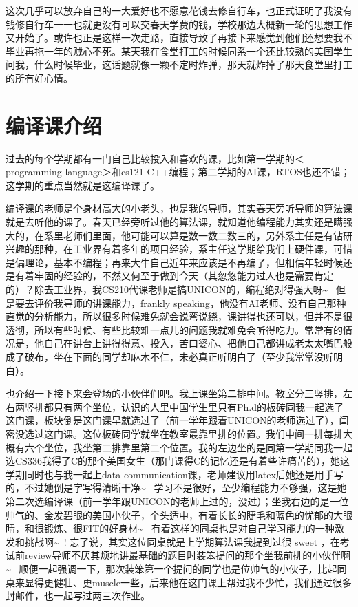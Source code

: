 \documentclass[12pt]{book}
\begin{document}
这次几乎可以放弃自己的一大爱好也不愿意花钱去修自行车，也正式证明了我没有钱修自行车一一也就更没有可以交春天学费的钱，学校那边大概新一轮的思想工作又开始了。或许也正是这样一次走路，直接导致了再接下来感觉到他们还想要我不毕业再拖一年的贼心不死。某天我在食堂打工的时候同系一个还比较熟的美国学生问我，什么时候毕业，这话题就像一颗不定时炸弹，那天就炸掉了那天食堂里打工的所有好心情。

\chapter{编译课介绍}
\label{sec-19}

过去的每个学期都有一门自己比较投入和喜欢的课，比如第一学期的＜programming language＞和cs121 C++编程；第二学期的AI课，RTOS也还不错；这学期的重点当然就是这编译课了。

编译课的老师是个身材高大的小老头，也是我的导师，其实春天旁听导师的算法课就是去听他的课了。春天已经旁听过他的算法课，就知道他编程能力其实还是瞒强大的，在系里老师们里面，他可能可以算是数一数二数三的，另外系主任是有钻研兴趣的那种，在工业界有着多年的项目经验，系主任这学期给我们上硬件课，可惜是偏理论，基本不编程；再来大牛自己近年来应该是不再编了，但相信年轻时候还是有着牢固的经验的，不然又何至于做到今天（其忽悠能力过人也是需要肯定的）？除去工业界，我CS210代课老师是搞UNICON的，编程绝对得强大呀\textasciitilde{}~ 但是要去评价我导师的讲课能力，frankly speaking，他没有AI老师、没有自己那种直觉的分析能力，所以很多时候难免就会说弯说绕，课讲得也还可以，但并不是很透彻，所以有些时候、有些比较难一点儿的问题我就难免会听得吃力。常常有的情况是，他自己在讲台上讲得得意、投入，苦口婆心、把他自己都讲成老太太嘴巴般成了破布，坐在下面的同学却麻木不仁，未必真正听明白了（至少我常常没听明白）。

也介绍一下接下来会登场的小伙伴们吧。我上课坐第二排中间。教室分三竖排，左右两竖排都只有两个坐位，认识的人里中国学生里只有Ph.d的板砖同我一起选了这门课，板块倒是这门课早就选过了（前一学年跟着UNICON的老师选过了），闺密没选过这门课。这位板砖同学就坐在教室最靠里排的位置。我们中间一排每排大概有六个坐位，我坐第二排靠里第二个位置。我的左边坐的是同第一学期同我一起选CS336我得了C的那个美国女生（那门课得C的记忆还是有着些许痛苦的），她这学期同时也与我一起上data communication课，老师建议用latex后她还是用手写的，不过她倒是字写得清晰干净\textasciitilde{}~ 学习不是很好，至少编程能力不够强，这是她第二次选编译课（前一学年跟UNICON的老师上过的，没过）；坐我右边的是一位帅气的、金发碧眼的美国小伙子，个头适中，有着长长的睫毛和蓝色的忧郁的大眼睛，和很锻炼、很FIT的好身材\textasciitilde{}~ 有着这样的同桌也是对自己学习能力的一种激发和挑战啊\textasciitilde{}~! 忘了说，其实这位同桌就是上学期算法课我提到过很 sweet ，在考试前review导师不厌其烦地讲最基础的题目时装笨提问的那个坐我前排的小伙伴啊\textasciitilde{}~ 顺便一起强调一下，那次装笨第一个提问的同学也是位帅气的小伙子，比起同桌来显得更健壮、更muscle一些，后来他在这门课上帮过我不少忙，我们通过很多封邮件，也一起写过两三次作业。
\end{document}

